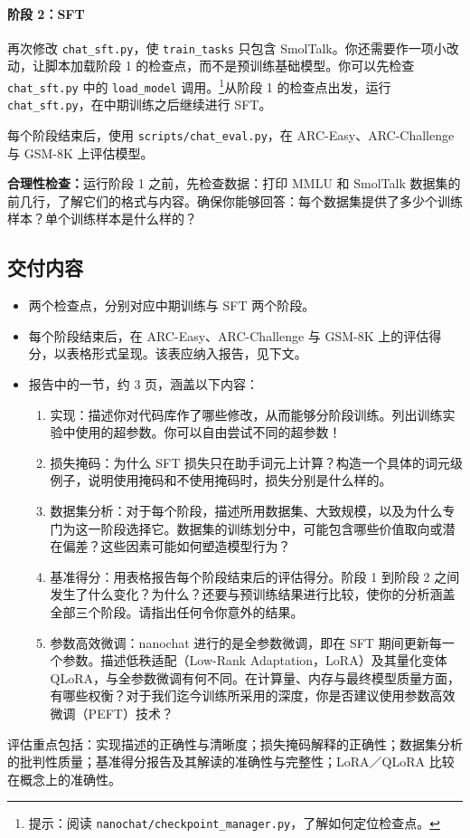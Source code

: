 \paragraph{阶段 2：SFT}
再次修改 \texttt{chat\_sft.py}，使 \texttt{train\_tasks} 只包含 SmolTalk。你还需要作一项小改动，让脚本加载阶段 1 的检查点，而不是预训练基础模型。你可以先检查 \texttt{chat\_sft.py} 中的 \texttt{load\_model} 调用。\footnote{提示：阅读 \texttt{nanochat/checkpoint\_manager.py}，了解如何定位检查点。}从阶段 1 的检查点出发，运行 \texttt{chat\_sft.py}，在中期训练之后继续进行 SFT。

每个阶段结束后，使用 \texttt{scripts/chat\_eval.py}，在 ARC-Easy、ARC-Challenge 与 GSM-8K 上评估模型。

\textbf{合理性检查：}运行阶段 1 之前，先检查数据：打印 MMLU 和 SmolTalk 数据集的前几行，了解它们的格式与内容。确保你能够回答：每个数据集提供了多少个训练样本？单个训练样本是什么样的？

\subsection{交付内容}

\begin{itemize}
    \item 两个检查点，分别对应中期训练与 SFT 两个阶段。
    \item 每个阶段结束后，在 ARC-Easy、ARC-Challenge 与 GSM-8K 上的评估得分，以表格形式呈现。该表应纳入报告，见下文。
    \item 报告中的一节，约 3 页，涵盖以下内容：
          \begin{enumerate}
              \item 实现：描述你对代码库作了哪些修改，从而能够分阶段训练。列出训练实验中使用的超参数。你可以自由尝试不同的超参数！
              \item 损失掩码：为什么 SFT 损失只在助手词元上计算？构造一个具体的词元级例子，说明使用掩码和不使用掩码时，损失分别是什么样的。
              \item 数据集分析：对于每个阶段，描述所用数据集、大致规模，以及为什么专门为这一阶段选择它。数据集的训练划分中，可能包含哪些价值取向或潜在偏差？这些因素可能如何塑造模型行为？
              \item 基准得分：用表格报告每个阶段结束后的评估得分。阶段 1 到阶段 2 之间发生了什么变化？为什么？还要与预训练结果进行比较，使你的分析涵盖全部三个阶段。请指出任何令你意外的结果。
              \item 参数高效微调：nanochat 进行的是全参数微调，即在 SFT 期间更新每一个参数。描述低秩适配（Low-Rank Adaptation，LoRA）及其量化变体 QLoRA，与全参数微调有何不同。在计算量、内存与最终模型质量方面，有哪些权衡？对于我们迄今训练所采用的深度，你是否建议使用参数高效微调（PEFT）技术？
          \end{enumerate}
\end{itemize}
评估重点包括：实现描述的正确性与清晰度；损失掩码解释的正确性；数据集分析的批判性质量；基准得分报告及其解读的准确性与完整性；LoRA／QLoRA 比较在概念上的准确性。

